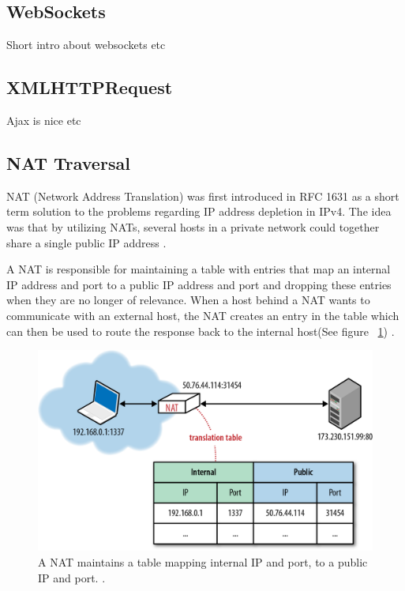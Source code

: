 \subsection{WebSockets}
Short intro about websockets etc

\subsection{XMLHTTPRequest}
Ajax is nice etc

\subsection{NAT Traversal}
NAT (Network Address Translation) was first introduced in RFC 1631 as a short term solution to the problems regarding IP address depletion in IPv4. The idea was that by utilizing NATs, several hosts in a private network could together share a single public IP address \cite{RFC1631:Online}.

A NAT is responsible for maintaining a table with entries that map an internal IP address and port to a public IP address and port and dropping these entries when they are no longer of relevance. When a host behind a NAT wants to communicate with an external host, the NAT creates an entry in the table which can then be used to route the response back to the internal host(See figure ~\ref{fig:NAT}) \cite{RFC5245:Online}.

\begin{figure}[htp]
\centering
\includegraphics[width=\textwidth,height=0.2\paperheight,keepaspectratio
]{figures/nat}
\caption{A NAT maintains a table mapping internal IP and port, to a public IP and port. \cite{NATIllustration:Online}.}
\label{fig:NAT}
\end{figure}

